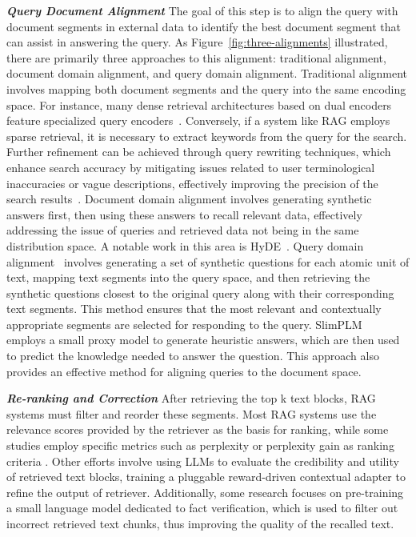 \textit{\textbf{Query Document Alignment}}  The goal of this step is to align the query with document segments in external data to identify the best document segment that can assist in answering the query. As Figure~\ref{fig:three-alignments} illustrated, there are primarily three approaches to this alignment: traditional alignment, document domain alignment, and query domain alignment. Traditional alignment involves mapping both document segments and the query into the same encoding space. For instance, many dense retrieval architectures based on dual encoders feature specialized query encoders~\cite{karpukhin2020dense, xiong2020approximate, hofstatter2021efficiently}. Conversely, if a system like RAG employs sparse retrieval, it is necessary to extract keywords from the query for the search. Further refinement can be achieved through query rewriting techniques, which enhance search accuracy by mitigating issues related to user terminological inaccuracies or vague descriptions, effectively improving the precision of the search results~\cite{ma2023query}. Document domain alignment involves generating synthetic answers first, then using these answers to recall relevant data, effectively addressing the issue of queries and retrieved data not being in the same distribution space. A notable work in this area is HyDE~\cite{gao2022precise}. Query domain alignment~\cite{raina2024question} involves generating a set of synthetic questions for each atomic unit of text, mapping text segments into the query space, and then retrieving the synthetic questions closest to the original query along with their corresponding text segments. This method ensures that the most relevant and contextually appropriate segments are selected for responding to the query. SlimPLM~\cite{tan2024small} employs a small proxy model to generate heuristic answers, which are then used to predict the knowledge needed to answer the question. This approach also provides an effective method for aligning queries to the document space.

\textit{\textbf{Re-ranking and Correction}} 
After retrieving the top k text blocks, RAG systems must filter and reorder these segments. Most RAG systems use the relevance scores provided by the retriever as the basis for ranking, while some studies employ specific metrics such as perplexity or perplexity gain as ranking criteria \cite{jiang2023llmlingua, jiang2023longllmlingua}. Other efforts involve using LLMs to evaluate the credibility and utility of retrieved text blocks, training a pluggable reward-driven contextual adapter to refine the output of retriever\cite{yang2023prca}. Additionally, some research focuses on pre-training a small language model dedicated to fact verification, which is used to filter out incorrect retrieved text chunks, thus improving the quality of the recalled text\cite{yan2024corrective}.

